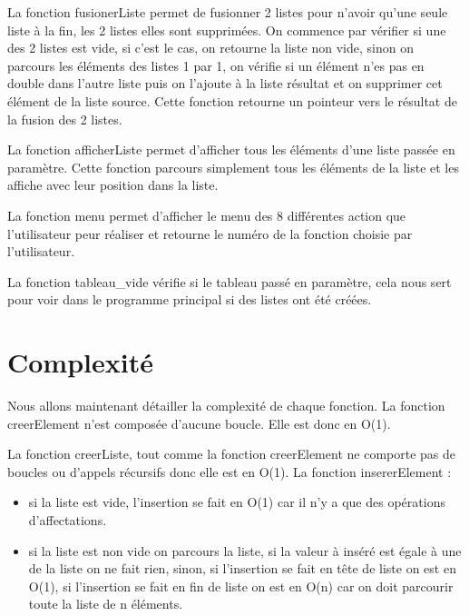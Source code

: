 \documentclass[11pt]{report}
\begin{document}
\medskip

La fonction fusionerListe permet de fusionner 2 listes pour n'avoir qu'une seule liste à la fin, les 2 listes elles sont supprimées. On commence par vérifier si une des 2 listes est vide, si c'est le cas, on retourne la liste non vide, sinon on parcours les éléments des listes 1 par 1, on vérifie si un élément n'es pas en double dans l'autre liste puis on l'ajoute à la liste résultat et on supprimer cet élément de la liste source. Cette fonction retourne un pointeur vers le résultat de la fusion des 2 listes. 

\medskip

La fonction afficherListe permet d'afficher tous les éléments d'une liste passée en paramètre. Cette fonction parcours simplement tous les éléments de la liste et les affiche avec leur position dans la liste. 

\medskip

La fonction menu permet d'afficher le menu des 8 différentes action que l'utilisateur peur réaliser et retourne le numéro de la fonction choisie par l'utilisateur. 

\medskip

La fonction tableau\_vide vérifie si le tableau passé en paramètre, cela nous sert pour voir dans le programme principal si des listes ont été créées. 
\section{Complexité}

Nous allons maintenant détailler la complexité de chaque fonction.
\medskip
La fonction creerElement n'est composée d'aucune boucle. Elle est donc en O(1).

La fonction creerListe, tout comme la fonction creerElement ne comporte pas de boucles ou d'appels récursifs donc elle est en O(1).
La fonction insererElement :
\begin{itemize}
	\item si la liste est vide, l'insertion se fait en O(1) car il n'y a que des opérations d'affectations.
	\item si la liste est non vide on parcours la liste, si la valeur à inséré est égale à une de la liste on ne fait rien, sinon, si l'insertion se fait en tête de liste on est en O(1), si l'insertion se fait en fin de liste on est en O(n) car on doit parcourir toute la liste de n éléments. 
	
\end{itemize}
\end{document}
